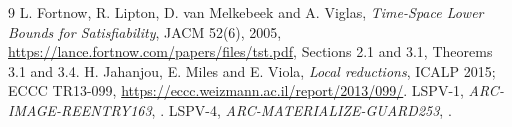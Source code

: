 \documentclass[11pt]{article}
\begin{document}
\begin{thebibliography}{9}
 L. Fortnow, R. Lipton, D. van Melkebeek and A. Viglas,
\emph{Time-Space Lower Bounds for Satisfiability}, JACM 52(6), 2005,
\url{https://lance.fortnow.com/papers/files/tst.pdf}, Sections 2.1 and 3.1, Theorems 3.1 and 3.4.
 H. Jahanjou, E. Miles and E. Viola,
\emph{Local reductions}, ICALP 2015; ECCC TR13-099,
\url{https://eccc.weizmann.ac.il/report/2013/099/}.
 LSPV-1, \emph{ARC-IMAGE-REENTRY163},
.
 LSPV-4, \emph{ARC-MATERIALIZE-GUARD253},
.
\end{thebibliography}
\end{document}
